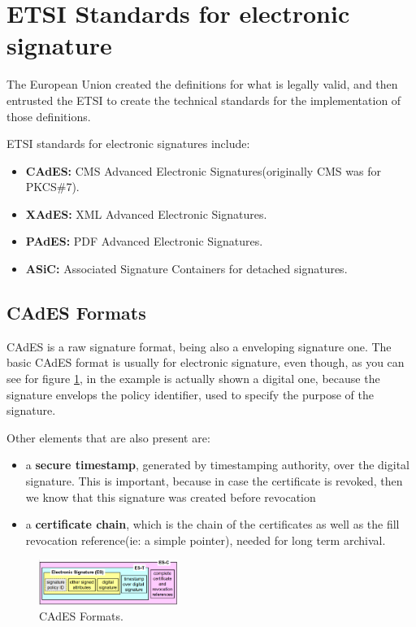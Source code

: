 \section{ETSI Standards for electronic signature}
The European Union created the definitions for what is legally valid,
and then entrusted the ETSI to create the technical standards for the
implementation of those definitions.

ETSI standards for electronic signatures include:
\begin{itemize}
    \item \textbf{CAdES:} CMS Advanced Electronic
      Signatures(originally CMS was for PKCS\#7).
    \item \textbf{XAdES:} XML Advanced Electronic Signatures.
    \item \textbf{PAdES:} PDF Advanced Electronic Signatures.
    \item \textbf{ASiC:} Associated Signature Containers for detached signatures.
\end{itemize}

\subsection{CAdES Formats}
CAdES is a raw signature format, being also a enveloping signature
one. The basic CAdES format is usually for electronic signature, even
though, as you can see for figure \ref{fig:cades format}, in the
example is actually shown a digital one, because the signature
envelops the policy identifier, used to specify the purpose of the 
signature.

Other elements that are also present are:
\begin{itemize}
  \item a \textbf{secure timestamp}, generated by timestamping
    authority, over the digital signature. This is important, because
    in case the certificate is revoked, then we know that this
    signature was created before revocation
  \item a \textbf{certificate chain}, which is the chain of the
    certificates as well as the fill revocation reference(ie: a simple
    pointer), needed for long term archival.

\end{itemize}

\begin{figure}[H]
  \centering
  \includegraphics[width=0.4\textwidth]{img/cades format.png}
  \caption{CAdES Formats.}
  \label{fig:cades format}
\end{figure}

